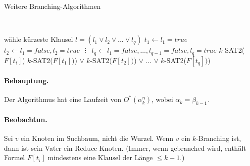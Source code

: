 \begin{section}{Weitere Branching-Algorithmen}
\begin{algorithm}[H]
     \\


    wähle {\color{red}kürzeste} Klausel \(l = (l_1 \vee l_2 \vee ... \vee l_q)\)\;
    $t_1 \leftarrow l_1 = true$\; 
    $t_2 \leftarrow l_1 = false, l_2 = true$\;
    \vdots
    $t_q \leftarrow l_1 = false, \dots, l_{q-1} = false, l_q = true$\; 
    {\color{red} 
       {
	\Return $k$-SAT2($F[t_i]$)
      }
    }
    \Return \(k\)-SAT2(\(F[t_1])\)) \(\vee\) \(k\)-SAT2(\(F[t_2])\)) \(\vee\) ... \(\vee\) \(k\)-SAT2(\(F[t_q])\))\;
  \end{algorithm}
  \paragraph{Behauptung.} Der Algorithmus hat eine Laufzeit von $O^*(\alpha_k^n)$, wobei $\alpha_k = \beta_{k-1}$.
  \paragraph{Beobachtun.} Sei $v$ ein Knoten im Suchbaum, nicht die Wurzel. Wenn $v$ ein $k$-Branching ist, dann ist sein Vater ein Reduce-Knoten. (Immer, wenn gebranched wird, enthält Formel $F[t_i]$ mindestens eine Klausel der Länge $\leq k-1$.)
\end{section}
  
  